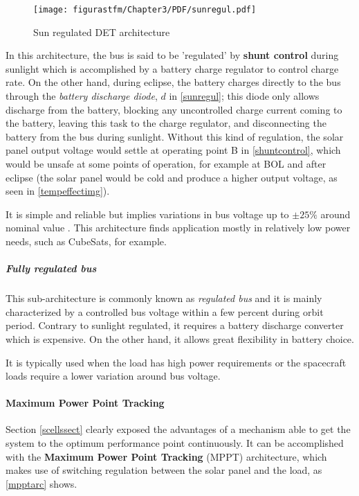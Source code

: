 	\begin{figure} [H] 				
				\centering
				\texttt{[image: figurastfm/Chapter3/PDF/sunregul.pdf]}
				\caption{Sun regulated \acrshort{DET} architecture \cite{spacecraftspower}} \label{sunregul}
			\end{figure}
	
	In this architecture, the bus is said to be 'regulated' by \textbf{shunt control} during sunlight which is accomplished by a battery charge regulator to control charge rate. On the other hand, during eclipse, the battery charges directly to the bus through the \textit{battery discharge diode}, $d$ in \autoref{sunregul}; this diode only allows discharge from the battery, blocking any uncontrolled charge current coming to the battery, leaving this task to the charge regulator, and disconnecting the battery from the bus during sunlight. Without this kind of regulation, the solar panel output voltage would settle at operating point B in \autoref{shuntcontrol}, which would be unsafe at some points of operation, for example at \acrshort{BOL} and after eclipse (the solar panel would be cold and produce a higher output voltage, as seen in \autoref{tempeffectimg}).
	
	It is simple and reliable but implies variations in bus voltage up to $\pm25 \%$ around nominal value \cite{spacecraftspower}. This architecture finds application mostly in relatively low power needs, such as CubeSats, for example.
	
	\subparagraph{Fully regulated bus} \label{fullyregulated}

	This sub-architecture is commonly known as \textit{regulated bus} and it is mainly characterized by a controlled bus voltage within a few percent during orbit period. Contrary to sunlight regulated, it requires a battery discharge converter which is expensive. On the other hand, it allows great flexibility in battery choice.
	
	It is typically used when the load has high power requirements or the spacecraft loads require a lower variation around bus voltage.


	\paragraph{Maximum Power Point Tracking} \label{mppt}
	
	Section \ref{scellssect} clearly exposed the advantages of a mechanism able to get the system to the optimum performance point continuously. It can be accomplished with the \textbf{Maximum Power Point Tracking} (\acrshort{MPPT}) architecture, which makes use of switching regulation between the solar panel and the load, as \autoref{mpptarc} shows.
	
